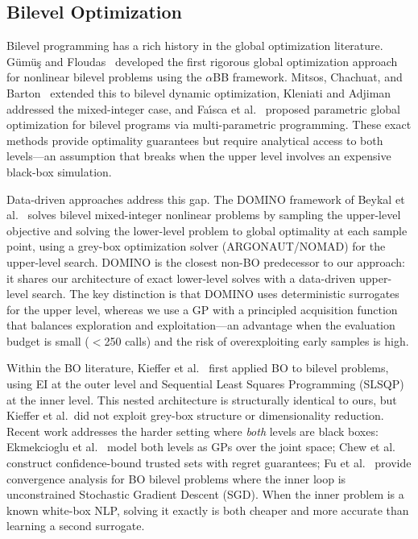 \documentclass[12pt,a4paper]{article}%
\theoremstyle{plain}%
\theoremstyle{remark}%
\theoremstyle{definition}%
\begin{document}
\subsection{Bilevel Optimization}

Bilevel programming has a rich history in the global optimization literature. G\"{u}m\"{u}\c{s} and Floudas~\cite{gumus2001bilevel} developed the first rigorous global optimization approach for nonlinear bilevel problems using the $\alpha$BB framework. Mitsos, Chachuat, and Barton~\cite{mitsos2009bilevel_dynamic} extended this to bilevel dynamic optimization, Kleniati and Adjiman~\cite{kleniati2014bilevel} addressed the mixed-integer case, and Fa{\'\i}sca et al.~\cite{faisca2007bilevel} proposed parametric global optimization for bilevel programs via multi-parametric programming. These exact methods provide optimality guarantees but require analytical access to both levels---an assumption that breaks when the upper level involves an expensive black-box simulation.

Data-driven approaches address this gap. The DOMINO framework of Beykal et al.~\cite{beykal2020domino} solves bilevel mixed-integer nonlinear problems by sampling the upper-level objective and solving the lower-level problem to global optimality at each sample point, using a grey-box optimization solver (ARGONAUT/NOMAD) for the upper-level search. DOMINO is the closest non-BO predecessor to our approach: it shares our architecture of exact lower-level solves with a data-driven upper-level search. The key distinction is that DOMINO uses deterministic surrogates for the upper level, whereas we use a GP with a principled acquisition function that balances exploration and exploitation---an advantage when the evaluation budget is small ($<$250 calls) and the risk of overexploiting early samples is high.

Within the BO literature, Kieffer et al.~\cite{kieffer2017bilevel} first applied BO to bilevel problems, using EI at the outer level and Sequential Least Squares Programming (SLSQP) at the inner level. This nested architecture is structurally identical to ours, but Kieffer et al.\ did not exploit grey-box structure or dimensionality reduction. Recent work addresses the harder setting where \emph{both} levels are black boxes: Ekmekcioglu et al.~\cite{ekmekcioglu2024bilevel} model both levels as GPs over the joint space; Chew et al.~\cite{chew2025bilbo} construct confidence-bound trusted sets with regret guarantees; Fu et al.~\cite{fu2024convergence} provide convergence analysis for BO bilevel problems where the inner loop is unconstrained Stochastic Gradient Descent (SGD). When the inner problem is a known white-box NLP, solving it exactly is both cheaper and more accurate than learning a second surrogate.
\end{document}

